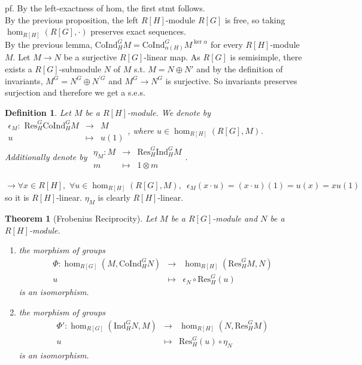 \documentclass[12pt,letterpaper]{report}
\newtheorem{definition}{Definition}[section]
\newtheorem{theorem}{Theorem}[section]
\begin{document}
pf. By the left-exactness of hom, the first stmt follows.
\\By the previous proposition, the left $R[H]$-module $R[G]$ is free, so taking $\hom_{R[H]}(R[G],\cdot)$ preserves exact sequences.
\\By the previous lemma, $\text{CoInd}_{H}^{G}M=\text{CoInd}_{\alpha(H)}^{G}M^{\ker\alpha}$ for every $R[H]$-module $M$. Let $M\rightarrow N$ be a surjective $R[G]$-linear map. As $R[G]$ is semisimple, there exists a $R[G]$-submodule $N$ of $M$ s.t. $M=N\oplus N'$ and by the definition of invariants, $M^{G}=N^{G}\oplus N^{'G}$ and $M^{G}\rightarrow N^{G}$ is surjective. So invariants preserves surjection and therefore we get a s.e.s. 
\begin{definition}Let $M$ be a $R[H]$-module. We denote by $\begin{array}{rrr}\epsilon_{M}:\text{ Res}_{H}^{G}\text{CoInd}_{H}^{G}M&\rightarrow &M\\u&\mapsto&u(1)\end{array}$, where $u\in \hom_{R[H]}(R[G],M)$. Additionally denote by $\begin{array}{rrr}\eta_{M}:M&\rightarrow&\text{Res}_{H}^{G}\text{Ind}_{H}^{G}M\\m&\mapsto&1\otimes m\end{array}$.\end{definition}
$\rightarrow \forall x\in R[H],\,\,\forall u\in \hom_{R[H]}(R[G],M),\,\,\,\epsilon_{M}(x\cdot u)=(x\cdot u)(1)=u(x)=xu(1)$ so it is $R[H]$-linear. $\eta_{M}$ is clearly $R[H]$-linear. 
\begin{theorem}[Frobenius Reciprocity] Let $M$ be a $R[G]$-module and $N$ be a $R[H]$-module. \begin{enumerate}\item the morphism of groups \begin{equation*}\begin{array}{rrr}\Phi:\hom_{R[G]}(M,\text{CoInd}_{H}^{G}N)&\rightarrow&\hom_{R[H]}(\text{Res}_{H}^{G}M,N)\\u&\mapsto&\epsilon_{N}\circ \text{Res}_{H}^{G}(u)\end{array}\end{equation*} is an isomorphism. 

\item the morphism of groups \begin{equation*}\begin{array}{rrr}\Phi':\hom_{R[G]}(\text{Ind}_{H}^{G}N,M)&\rightarrow&\hom_{R[H]}(N,\text{Res}_{H}^{G}M)\\u&\mapsto&\text{Res}_{H}^{G}(u)\circ\eta_{N}\end{array}\end{equation*} is an isomorphism.\end{enumerate}\end{theorem}
\end{document}
